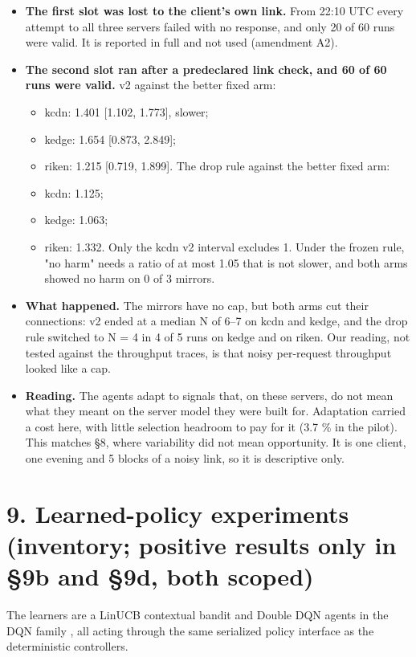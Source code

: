 \documentclass[conference]{IEEEtran}
\begin{document}
\begin{itemize}
\item \textbf{The first slot was lost to the client's own link.} From 22:10 UTC every attempt to all three servers failed with no response, and only 20 of 60 runs were valid. It is reported in full and not used (amendment A2).
\item \textbf{The second slot ran after a predeclared link check, and 60 of 60 runs were valid.} v2 against the better fixed arm:
\begin{itemize}
\item kcdn: 1.401 [1.102, 1.773], slower;
\item kedge: 1.654 [0.873, 2.849];
\item riken: 1.215 [0.719, 1.899]. The drop rule against the better fixed arm:
\item kcdn: 1.125;
\item kedge: 1.063;
\item riken: 1.332. Only the kcdn v2 interval excludes 1. Under the frozen rule, "no harm" needs a ratio of at most 1.05 that is not slower, and both arms showed no harm on 0 of 3 mirrors.
\end{itemize}
\item \textbf{What happened.} The mirrors have no cap, but both arms cut their connections: v2 ended at a median N of 6–7 on kcdn and kedge, and the drop rule switched to N = 4 in 4 of 5 runs on kedge and on riken. Our reading, not tested against the throughput traces, is that noisy per-request throughput looked like a cap.
\item \textbf{Reading.} The agents adapt to signals that, on these servers, do not mean what they meant on the server model they were built for. Adaptation carried a cost here, with little selection headroom to pay for it (3.7 \% in the pilot). This matches §8, where variability did not mean opportunity. It is one client, one evening and 5 blocks of a noisy link, so it is descriptive only.
\end{itemize}

\section*{9. Learned-policy experiments (inventory; positive results only in §9b and §9d, both scoped)}

The learners are a LinUCB contextual bandit \cite{li2010linucb} and Double DQN \cite{vanhasselt2016ddqn} agents in the DQN family \cite{mnih2015dqn}, all acting through the same serialized policy interface as the deterministic controllers.
\end{document}
